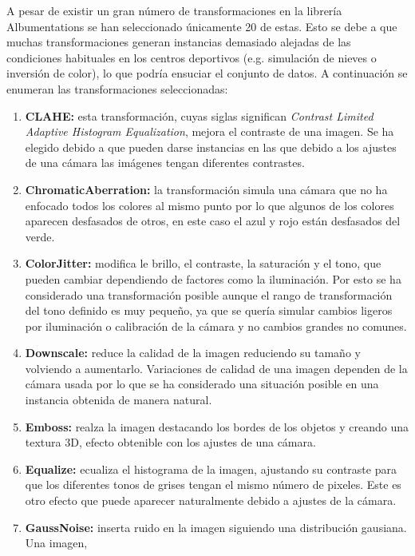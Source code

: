 \documentclass[12pt]{report} %
\begin{document}
    A pesar de existir un gran número de transformaciones en la librería
    Albumentations se han seleccionado únicamente 20 de estas. Esto se debe a
    que muchas transformaciones generan instancias demasiado alejadas de las
    condiciones habituales en los centros deportivos (e.g. simulación de nieves
    o inversión de color), lo que podría ensuciar el conjunto de datos. A
    continuación se enumeran las transformaciones seleccionadas:

    \begin{enumerate} \item \textbf{CLAHE:} esta transformación, cuyas siglas
    significan \textit{Contrast Limited Adaptive Histogram Equalization},
    mejora el contraste de una imagen. Se ha elegido debido a que pueden darse
    instancias en las que debido a los ajustes de una cámara las imágenes
    tengan diferentes contrastes.
    \item \textbf{ChromaticAberration:} la
    transformación simula una cámara que no ha enfocado todos los colores al
    mismo punto por lo que algunos de los colores aparecen desfasados de otros,
    en este caso el azul y rojo están desfasados del verde.
    \item \textbf{ColorJitter:} modifica le brillo, el contraste, la saturación y el
    tono, que pueden cambiar dependiendo de factores como la iluminación. Por
    esto se ha considerado una transformación posible aunque el rango de
    transformación del tono definido es muy pequeño, ya que se quería simular
    cambios ligeros por iluminación o calibración de la cámara y no cambios
    grandes no comunes.
    \item \textbf{Downscale:} reduce la calidad de la
    imagen reduciendo su tamaño y volviendo a aumentarlo.  Variaciones de
    calidad de una imagen dependen de la cámara usada por lo que se ha
    considerado una situación posible en una instancia obtenida de manera
    natural.
    \item \textbf{Emboss:} realza la imagen destacando los bordes de
    los objetos y creando una textura 3D, efecto obtenible con los ajustes de
    una cámara.
    \item \textbf{Equalize:} ecualiza el histograma de la imagen,
    ajustando su contraste para que los diferentes tonos de grises tengan el
    mismo número de pixeles. Este es otro efecto que puede aparecer
    naturalmente debido a ajustes de la cámara.
    \item \textbf{GaussNoise:}
    inserta ruido en la imagen siguiendo una distribución gausiana. Una imagen,

\end{enumerate}
\end{document}
